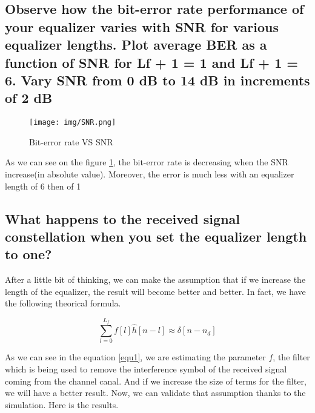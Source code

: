 \documentclass[frenchb, oneside, headings=normal]{scrartcl}
\begin{document}
\subsection{Observe how the bit-error rate performance
of your equalizer varies with SNR for various equalizer lengths. Plot average BER as a function of SNR for Lf + 1 = 1 and Lf + 1 = 6.
Vary SNR from 0 dB to 14 dB in increments of 2 dB}

\begin{figure}[ht!]
\centering
\texttt{[image: img/SNR.png]}
\caption{Bit-error rate VS SNR}
\label{BER}
\end{figure}


As we can see on the figure \ref{BER}, the bit-error rate is decreasing when the SNR increase(in absolute value).
Moreover, the error is much less with an equalizer length of 6 then  of 1


\subsection{What happens to the received signal constellation when you set the equalizer length to one?}

After a little bit of thinking, we can make the assumption that if we increase the length of the equalizer, the result will become better and better. In fact, we have the following theorical formula. 

\begin{equation}
\sum_{l=0}^{L_f}f[l]\hat{h}[n-l]\approx \delta [n-n_d]
\label{equ1}
\end{equation}

As we can see in the equation \ref{equ1}, we are estimating the parameter $f$, the filter which is being used to remove the interference symbol of the received signal coming from the channel canal. And if we increase the size of terms for the filter, we will have a better result. Now, we can validate that assumption thanks to the simulation. Here is the results.
\end{document}

